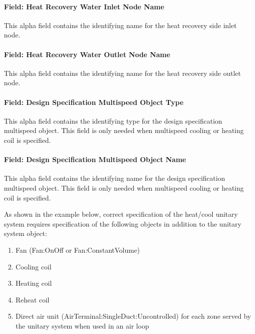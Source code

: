 \paragraph{Field: Heat Recovery Water Inlet Node Name}\label{field-heat-recovery-water-inlet-node-name-000}

This alpha field contains the identifying name for the heat recovery side inlet node.

\paragraph{Field: Heat Recovery Water Outlet Node Name}\label{field-heat-recovery-water-outlet-node-name-000}

This alpha field contains the identifying name for the heat recovery side outlet node.

\paragraph{Field: Design Specification Multispeed Object Type}\label{field-design-specification-multispeed-object-type}

This alpha field contains the identifying type for the design specification multispeed object. This field is only needed when multispeed cooling or heating coil is specified.

\paragraph{Field: Design Specification Multispeed Object Name}\label{field-design-specification-multispeed-object-name}

This alpha field contains the identifying name for the design specification multispeed object. This field is only needed when multispeed cooling or heating coil is specified.

As shown in the example below, correct specification of the heat/cool unitary system requires specification of the following objects in addition to the unitary system object:

\begin{enumerate}
\def\labelenumi{\arabic{enumi})}
\item
  Fan (Fan:OnOff or Fan:ConstantVolume)
\item
  Cooling coil
\item
  Heating coil
\item
  Reheat coil
\item
  Direct air unit (AirTerminal:SingleDuct:Uncontrolled) for each zone served by the unitary system when used in an air loop
\end{enumerate}

